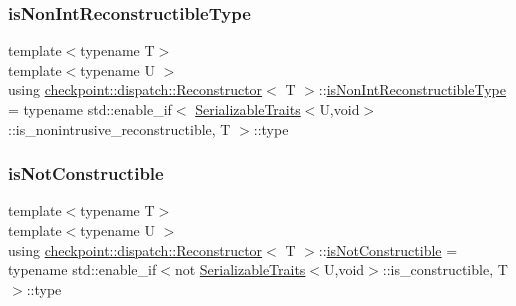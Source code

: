 \mbox{\label{structcheckpoint_1_1dispatch_1_1_reconstructor_a522861d587505c7fbe63d5a7a913b298}} 
\subsubsection{\texorpdfstring{is\+Non\+Int\+Reconstructible\+Type}{isNonIntReconstructibleType}}
{\footnotesize\ttfamily template$<$typename T$>$ \\
template$<$typename U $>$ \\
using \hyperlink{structcheckpoint_1_1dispatch_1_1_reconstructor}{checkpoint\+::dispatch\+::\+Reconstructor}$<$ T $>$\+::\hyperlink{structcheckpoint_1_1dispatch_1_1_reconstructor_a522861d587505c7fbe63d5a7a913b298}{is\+Non\+Int\+Reconstructible\+Type} =  typename std\+::enable\+\_\+if$<$ \hyperlink{structcheckpoint_1_1_serializable_traits}{Serializable\+Traits}$<$U,void$>$\+::is\+\_\+nonintrusive\+\_\+reconstructible, T $>$\+::type}

\mbox{\label{structcheckpoint_1_1dispatch_1_1_reconstructor_acfaccf4e4d76f6fdf5fc4890f01a6744}} 
\subsubsection{\texorpdfstring{is\+Not\+Constructible}{isNotConstructible}}
{\footnotesize\ttfamily template$<$typename T$>$ \\
template$<$typename U $>$ \\
using \hyperlink{structcheckpoint_1_1dispatch_1_1_reconstructor}{checkpoint\+::dispatch\+::\+Reconstructor}$<$ T $>$\+::\hyperlink{structcheckpoint_1_1dispatch_1_1_reconstructor_acfaccf4e4d76f6fdf5fc4890f01a6744}{is\+Not\+Constructible} =  typename std\+::enable\+\_\+if$<$not \hyperlink{structcheckpoint_1_1_serializable_traits}{Serializable\+Traits}$<$U,void$>$\+::is\+\_\+constructible, T$>$\+::type}

